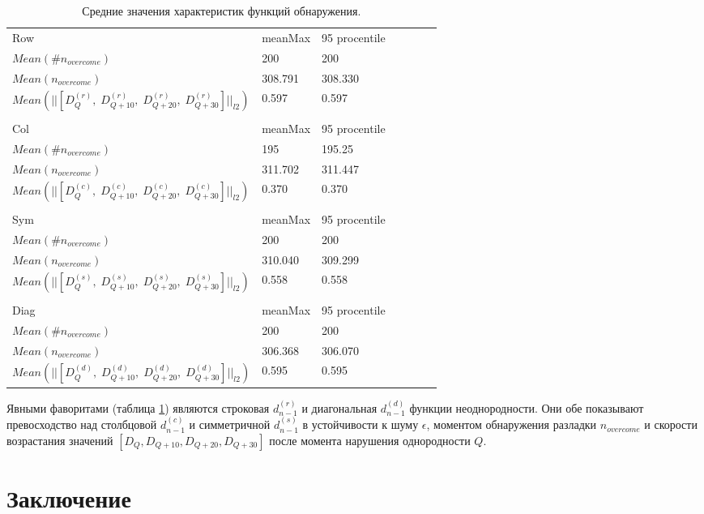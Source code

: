 \documentclass[specialist, substylefile = spbu.rtx,
			   subf, href, 12pt]{disser}
\begin{document}
\begin{table}[!hhh]
	\caption{Средние значения характеристик функций обнаружения.}
	\begin{tabular}{lllllll}
		Row & meanMax & 95 procentile \\
		$Mean(\#n_{overcome})$ & 200 & 200 \\
		$Mean(n_{overcome})$ & 308.791 & 308.330 \\
		$Mean(||[D_Q^{(r)},\; D_{Q+10}^{(r)},\; D_{Q+20}^{(r)},\; D_{Q+30}^{(r)}]||_{l2})$ & 0.597 & 0.597 \\
		&  &  \\
		Col & meanMax & 95 procentile \\
		$Mean(\#n_{overcome})$ & 195 & 195.25 \\
		$Mean(n_{overcome})$ & 311.702 & 311.447 \\
		$Mean(||[D_Q^{(c)},\; D_{Q+10}^{(c)},\; D_{Q+20}^{(c)},\; D_{Q+30}^{(c)}]||_{l2})$ & 0.370 & 0.370 \\
		&  &  \\
		Sym & meanMax & 95 procentile \\
		$Mean(\#n_{overcome})$ & 200 & 200 \\
		$Mean(n_{overcome})$ & 310.040 & 309.299 \\
		$Mean(||[D_Q^{(s)},\; D_{Q+10}^{(s)},\; D_{Q+20}^{(s)},\; D_{Q+30}^{(s)}]||_{l2})$ & 0.558 & 0.558 \\
		&  &  \\
		Diag & meanMax & 95 procentile \\
		$Mean(\#n_{overcome})$ & 200 & 200 \\
		$Mean(n_{overcome})$ & 306.368 & 306.070 \\
		$Mean(||[D_Q^{(d)},\; D_{Q+10}^{(d)},\; D_{Q+20}^{(d)},\; D_{Q+30}^{(d)}]||_{l2})$ & 0.595 & 0.595
	\end{tabular}
	\label{tab:AvgResultsNoise}
\end{table}

Явными фаворитами (таблица \ref{tab:AvgResultsNoise}) являются строковая $d_{n-1}^{(r)}$ и диагональная $d_{n-1}^{(d)}$ функции неоднородности. Они обе показывают превосходство над столбцовой $d_{n-1}^{(c)}$ и симметричной $d_{n-1}^{(s)}$ в устойчивости к шуму $\epsilon$, моментом обнаружения разладки $n_{overcome}$ и скорости возрастания значений $[D_Q, D_{Q+10}, D_{Q+20}, D_{Q+30}]$ после момента нарушения однородности $Q$.


\newpage
\chapter*{Заключение}
\end{document}
